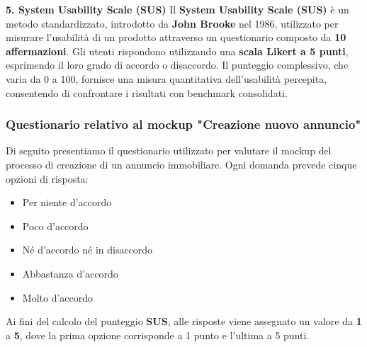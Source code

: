 \vspace{0.5cm} %
\textbf{5. System Usability Scale (SUS)}
\newline
\newline
Il \textbf{System Usability Scale (SUS)} è un metodo standardizzato, introdotto da \textbf{John Brooke} nel 1986, utilizzato per misurare l’usabilità di un prodotto attraverso un questionario composto da \textbf{10 affermazioni}. Gli utenti rispondono utilizzando una \textbf{scala Likert a 5 punti}, esprimendo il loro grado di accordo o disaccordo. Il punteggio complessivo, che varia da 0 a 100, fornisce una misura quantitativa dell’usabilità percepita, consentendo di confrontare i risultati con benchmark consolidati.

\vspace{0.5cm} %
\subsubsection{Questionario relativo al mockup "Creazione nuovo annuncio"}

Di seguito presentiamo il questionario utilizzato per valutare il mockup del processo di creazione di un annuncio immobiliare. Ogni domanda prevede cinque opzioni di risposta:

\begin{itemize}
    \item Per niente d’accordo
    \item Poco d’accordo
    \item Né d’accordo né in disaccordo
    \item Abbastanza d’accordo
    \item Molto d’accordo
\end{itemize}
Ai fini del calcolo del punteggio \textbf{SUS}, alle risposte viene assegnato un valore da \textbf{1} a \textbf{5}, dove la prima opzione corrisponde a 1 punto e l’ultima a 5 punti.

\vspace{0.5cm} %


